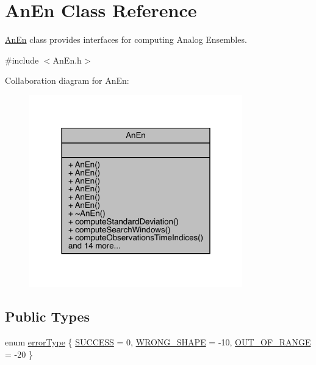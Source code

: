 \hypertarget{class_an_en}{}\section{An\+En Class Reference}
\label{class_an_en}


\mbox{\hyperlink{class_an_en}{An\+En}} class provides interfaces for computing Analog Ensembles.  




{\ttfamily \#include $<$An\+En.\+h$>$}



Collaboration diagram for An\+En\+:
\nopagebreak
\begin{figure}[H]
\begin{center}
\leavevmode
\includegraphics[width=262pt]{class_an_en__coll__graph}
\end{center}
\end{figure}
\subsection*{Public Types}
\begin{DoxyCompactItemize}
\item 
enum \mbox{\hyperlink{class_an_en_a0e256eb89d102d318a47d936b02242bf}{error\+Type}} \{ \mbox{\hyperlink{class_an_en_a0e256eb89d102d318a47d936b02242bfa0e5f548f45c8bb94aa25d3f12347194c}{S\+U\+C\+C\+E\+SS}} = 0, 
\mbox{\hyperlink{class_an_en_a0e256eb89d102d318a47d936b02242bfaba4bb62ffbd9a9d41b7c830ca8aa6639}{W\+R\+O\+N\+G\+\_\+\+S\+H\+A\+PE}} = -\/10, 
\mbox{\hyperlink{class_an_en_a0e256eb89d102d318a47d936b02242bfa4692ea596022bae2dfed00f33ea91e65}{O\+U\+T\+\_\+\+O\+F\+\_\+\+R\+A\+N\+GE}} = -\/20
 \}
\end{DoxyCompactItemize}
